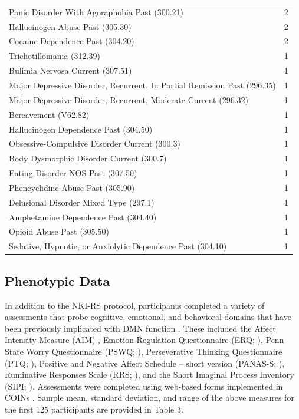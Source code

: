 \begin{table}[h!]
\begin{tabular}{ lr }
        Panic Disorder With Agoraphobia Past (300.21)  & 2 \\
        Hallucinogen Abuse Past (305.30)  &  2 \\
        Cocaine Dependence Past (304.20)  &  2 \\
        Trichotillomania (312.39)  & 1 \\
        Bulimia Nervosa Current (307.51)  &  1 \\
        Major Depressive Disorder, Recurrent, In Partial Remission Past (296.35)  &  1 \\
        Major Depressive Disorder, Recurrent, Moderate Current (296.32)  & 1 \\
        Bereavement (V62.82)    & 1 \\
        Hallucinogen Dependence Past (304.50)  & 1 \\
        Obsessive-Compulsive Disorder Current (300.3) &  1 \\
        Body Dysmorphic Disorder Current (300.7)  &  1 \\
        Eating Disorder NOS Past (307.50) &  1 \\
        Phencyclidine Abuse Past (305.90) &  1 \\
        Delusional Disorder Mixed Type (297.1) &  1 \\
        Amphetamine Dependence Past (304.40)  &  1 \\
        Opioid Abuse Past (305.50) & 1 \\
        Sedative, Hypnotic, or Anxiolytic Dependence Past (304.10) &  1 \\
      \end{tabular}
\label{table:psych}
\end{table}

\subsection{Phenotypic Data}

In addition to the NKI-RS protocol, participants completed a variety of assessments that probe cognitive, emotional, and behavioral domains that have been previously implicated with DMN function \cite{Andrews-Hanna2014,Hamilton2011,Sheline2009,Buckner2008}. These included the Affect Intensity Measure (AIM) \cite{Larsen1986}, Emotion Regulation Questionnaire (ERQ; \cite{Gross2003}), Penn State Worry Questionnaire (PSWQ; \cite{Meyer1990}), Perseverative Thinking Questionnaire (PTQ; \cite{Ehring2011}), Positive and Negative Affect Schedule – short version (PANAS-S; \cite{Watson1988}), Ruminative Responses Scale (RRS; \cite{Treynor2003}), and the Short Imaginal Process Inventory (SIPI; \cite{Huba1981}). Assessments were completed using web-based forms implemented in COINs \cite{Scott2011}. Sample mean, standard deviation, and range of the above measures for the first 125 participants are provided in Table 3.


